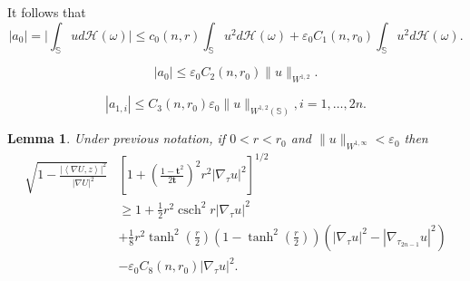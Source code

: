 \documentclass[10pt,a4paper]{amsart}
\newtheorem{lemma}{Lemma}
\newcommand{\abs}[1]{\lvert#1\rvert}
\newcommand{\csch}{\operatorname{csch}}
\def\ge{\geqslant}
\begin{document}
It follows that \begin{equation}\label{estU}|a_0|=\abs{\int_{\mathbb{S}}     u d\mathcal{H}(\omega)}\le c_0(n,r)\int_{\mathbb{S}} u^2 d\mathcal{H}(\omega)+ \varepsilon_0  C_1(n,r_0)\int_{\mathbb{S}} u^2 d\mathcal{H}(\omega).\end{equation}

\begin{equation}\label{rur}|a_0|\le \varepsilon_0 C_2(n,r_0)\|u\|_{W^{1,2}}.\end{equation}

\begin{equation}\label{estuom}\left|a_{1,i}\right|\le C_3(n,r_0)\varepsilon_0\|u\|_{W^{1,2}(\mathbb{S})}, i=1,\dots, 2n.\end{equation}

\begin{lemma}\label{lema22} Under previous notation, %
if $0<r<r_0$ and $\|u\|_{W^{1,\infty}}<\varepsilon_0$ then
\[\begin{split}{\sqrt{1-\frac{|\left<\nabla U, z\right>|^2}{|\nabla U|^2}}}&\left[ 1 + \left( \frac{1 - \mathbf{t}^2}{2\mathbf{t}} \right)^2 r^2 |\nabla_\tau u|^2 \right]^{1/2}
\\&\ge 1+\frac{1}{2}  r^2 \csch^2 r |\nabla_\tau u|^2\\&+\frac{1}{8} r^2 \tanh^2(\frac{r}{2})(1-\tanh^2(\frac{r}{2}))(|\nabla_\tau u|^2-|\nabla_{\tau_{2n-1}} u|^2) \\&-\varepsilon_0 C_{8}(n,r_0)|\nabla_\tau u|^2.\end{split}\]
\end{lemma}
\end{document}
